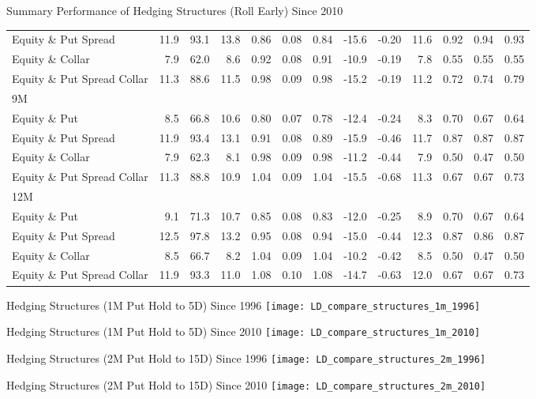 \documentclass{beamer}
\begin{document}
\begin{frame}{\normalsize Summary Performance of Hedging Structures (Roll Early) Since 2010}
{\begin{tabular}{lrrrrrrrrrrrr}
Equity \& Put Spread & 11.9 & 93.1 & 13.8 & 0.86 & 0.08 & 0.84 & -15.6 & -0.20 & 11.6 & 0.92 & 0.94 & 0.93\\
Equity \& Collar & 7.9 & 62.0 & 8.6 & 0.92 & 0.08 & 0.91 & -10.9 & -0.19 & 7.8 & 0.55 & 0.55 & 0.55\\
Equity \& Put Spread Collar & 11.3 & 88.6 & 11.5 & 0.98 & 0.09 & 0.98 & -15.2 & -0.19 & 11.2 & 0.72 & 0.74 & 0.79\\
\midrule
9M \\
\midrule
Equity \& Put & 8.5 & 66.8 & 10.6 & 0.80 & 0.07 & 0.78 & -12.4 & -0.24 & 8.3 & 0.70 & 0.67 & 0.64\\
Equity \& Put Spread & 11.9 & 93.4 & 13.1 & 0.91 & 0.08 & 0.89 & -15.9 & -0.46 & 11.7 & 0.87 & 0.87 & 0.87\\
Equity \& Collar & 7.9 & 62.3 & 8.1 & 0.98 & 0.09 & 0.98 & -11.2 & -0.44 & 7.9 & 0.50 & 0.47 & 0.50\\
Equity \& Put Spread Collar & 11.3 & 88.8 & 10.9 & 1.04 & 0.09 & 1.04 & -15.5 & -0.68 & 11.3 & 0.67 & 0.67 & 0.73\\
\midrule
12M \\
\midrule
Equity \& Put & 9.1 & 71.3 & 10.7 & 0.85 & 0.08 & 0.83 & -12.0 & -0.25 & 8.9 & 0.70 & 0.67 & 0.64\\
Equity \& Put Spread & 12.5 & 97.8 & 13.2 & 0.95 & 0.08 & 0.94 & -15.0 & -0.44 & 12.3 & 0.87 & 0.86 & 0.87\\
Equity \& Collar & 8.5 & 66.7 & 8.2 & 1.04 & 0.09 & 1.04 & -10.2 & -0.42 & 8.5 & 0.50 & 0.47 & 0.50\\
Equity \& Put Spread Collar & 11.9 & 93.3 & 11.0 & 1.08 & 0.10 & 1.08 & -14.7 & -0.63 & 12.0 & 0.67 & 0.67 & 0.73\\
\bottomrule
\end{tabular}
}
\end{frame}

\begin{frame}{Hedging Structures (1M Put Hold to 5D) Since 1996}
\texttt{[image: LD\_compare\_structures\_1m\_1996]}
\end{frame}
\begin{frame}{Hedging Structures (1M Put Hold to 5D) Since 2010}
\texttt{[image: LD\_compare\_structures\_1m\_2010]}
\end{frame}

\begin{frame}{Hedging Structures (2M Put Hold to 15D) Since 1996}
\texttt{[image: LD\_compare\_structures\_2m\_1996]}
\end{frame}
\begin{frame}{Hedging Structures (2M Put Hold to 15D) Since 2010}
\texttt{[image: LD\_compare\_structures\_2m\_2010]}
\end{frame}
\end{document}
